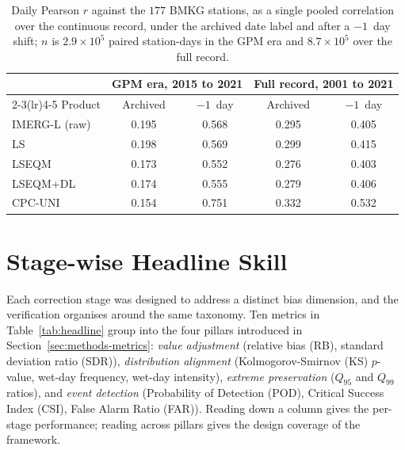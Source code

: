 \begin{table}[H]
\centering
\caption[Daily correlation against BMKG under two date labels]{Daily
Pearson $r$ against the $177$ BMKG stations, as a single pooled
correlation over the continuous record, under the archived date
label and after a $-1$~day shift; $n$ is $2.9\times10^{5}$ paired
station-days in the GPM era and $8.7\times10^{5}$ over the full
record.\label{tab:pairwise-daylabel}}
\begingroup\small
\begin{tabular*}{\textwidth}{@{\extracolsep{\fill}}lcccc@{}}
\toprule
& \multicolumn{2}{c}{GPM era, 2015 to 2021}
& \multicolumn{2}{c}{Full record, 2001 to 2021} \\
\cmidrule(lr){2-3}\cmidrule(lr){4-5}
Product & Archived & $-1$~day & Archived & $-1$~day \\
\midrule
IMERG-L (raw)   & 0.195 & 0.568 & 0.295 & 0.405 \\
LS              & 0.198 & 0.569 & 0.299 & 0.415 \\
LSEQM           & 0.173 & 0.552 & 0.276 & 0.403 \\
LSEQM+DL        & 0.174 & 0.555 & 0.279 & 0.406 \\
\addlinespace
CPC-UNI         & 0.154 & 0.751 & 0.332 & 0.532 \\
\bottomrule
\end{tabular*}
\endgroup
\end{table}


\section{Stage-wise Headline Skill}\label{sec:results-headline}

Each correction stage was designed to address a distinct bias
dimension, and the verification organises around the same
taxonomy. Ten metrics in Table~\ref{tab:headline} group into the
four pillars introduced in Section~\ref{sec:methods-metrics}:
\textit{value adjustment} (relative bias (RB), standard deviation
ratio (SDR)), \textit{distribution alignment} (Kolmogorov-Smirnov (KS) $p$-value, wet-day
frequency, wet-day intensity), \textit{extreme preservation}
($Q_{95}$ and $Q_{99}$ ratios), and \textit{event detection}
(Probability of Detection (POD), Critical Success Index (CSI), False Alarm Ratio (FAR)). Reading down a column gives the per-stage
performance; reading across pillars gives the design coverage of
the framework.

